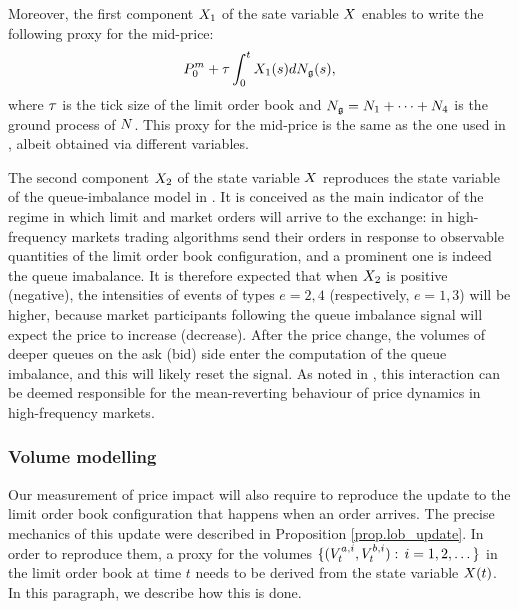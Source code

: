 \documentclass[10pt, article,table]{article}
\begin{document}
Moreover, the first component $\stateVariable_1$ of the sate variable $\stateVariable$ enables to write the following proxy for the mid-price:
\begin{equation}\label{eq.midprice_proxy}
 \midprice_0 + \tickSizeOfLOB \intzerot \stateVariable_1(s) d\groundProc(s),
\end{equation}
where $\tickSizeOfLOB$ is the tick size of the limit order book and $\groundProc = \countingProc[1] + \dots + \countingProc[4]$ is the ground process of $\multiCountingProc$. This proxy for the mid-price  is the same as the one used in \citealp{BM14haw}, albeit obtained via different variables. 

The second component $\stateVariable_2$ of the state variable $\stateVariable$ reproduces the state variable of the queue-imbalance model in \citealp{MP18sta}. It is conceived as the main indicator of the regime in which limit and market orders will arrive to the exchange: in high-frequency markets trading algorithms send their orders in response to observable quantities of the limit order book configuration, and a prominent one is indeed the queue imabalance. It is therefore expected that when $\stateVariable_2$ is positive (negative), the intensities of events of types $e=2,4$ (respectively, $e=1,3$) will be higher, because market participants following the queue imbalance signal will expect the price to increase (decrease). After the price change,  the volumes of deeper queues on the ask (bid) side enter the computation of the queue imbalance, and this will likely reset the signal.  As noted in \citealp{MP18sta}, this interaction can be deemed responsible for the mean-reverting behaviour of price dynamics in high-frequency markets. 


\subsubsection{Volume modelling}
Our measurement of price impact will also require to reproduce the update to the limit order book configuration that happens when an order arrives. The precise mechanics of this update were described in Proposition \ref{prop.lob_update}. In order to reproduce them, a proxy for the volumes $\lbrace (\nthBestAskVolume[i]_t, \nthBestBidVolume[i]_t): \, i=1,2,\dots\rbrace$ in the limit order book at time $t$ needs to be derived from the state variable $\stateVariable(t)$. In this paragraph, we describe how this is done. 
\end{document}
